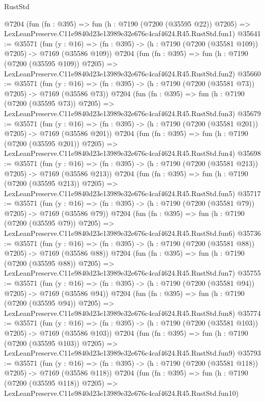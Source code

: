 \begin{lexlean}{RustStd}
\begin{coremodule}
    @7204
    (fun (fn : @395) =>
    fun (h : @7190 (@7200 (@35595 @22)) @7205) =>
    LexLeanPreserve.C11e9840d23e13989e32e676c4caf4624.R45.RustStd.fun1)
@35641 := @35571
    (fun (y : @16) => (fn : @395) -> (h : @7190 (@7200 (@35581 @109)) @7205) -> @7169 (@35586 @109))
    @7204
    (fun (fn : @395) =>
    fun (h : @7190 (@7200 (@35595 @109)) @7205) =>
    LexLeanPreserve.C11e9840d23e13989e32e676c4caf4624.R45.RustStd.fun2)
@35660 := @35571
    (fun (y : @16) => (fn : @395) -> (h : @7190 (@7200 (@35581 @73)) @7205) -> @7169 (@35586 @73))
    @7204
    (fun (fn : @395) =>
    fun (h : @7190 (@7200 (@35595 @73)) @7205) =>
    LexLeanPreserve.C11e9840d23e13989e32e676c4caf4624.R45.RustStd.fun3)
@35679 := @35571
    (fun (y : @16) => (fn : @395) -> (h : @7190 (@7200 (@35581 @201)) @7205) -> @7169 (@35586 @201))
    @7204
    (fun (fn : @395) =>
    fun (h : @7190 (@7200 (@35595 @201)) @7205) =>
    LexLeanPreserve.C11e9840d23e13989e32e676c4caf4624.R45.RustStd.fun4)
@35698 := @35571
    (fun (y : @16) => (fn : @395) -> (h : @7190 (@7200 (@35581 @213)) @7205) -> @7169 (@35586 @213))
    @7204
    (fun (fn : @395) =>
    fun (h : @7190 (@7200 (@35595 @213)) @7205) =>
    LexLeanPreserve.C11e9840d23e13989e32e676c4caf4624.R45.RustStd.fun5)
@35717 := @35571
    (fun (y : @16) => (fn : @395) -> (h : @7190 (@7200 (@35581 @79)) @7205) -> @7169 (@35586 @79))
    @7204
    (fun (fn : @395) =>
    fun (h : @7190 (@7200 (@35595 @79)) @7205) =>
    LexLeanPreserve.C11e9840d23e13989e32e676c4caf4624.R45.RustStd.fun6)
@35736 := @35571
    (fun (y : @16) => (fn : @395) -> (h : @7190 (@7200 (@35581 @88)) @7205) -> @7169 (@35586 @88))
    @7204
    (fun (fn : @395) =>
    fun (h : @7190 (@7200 (@35595 @88)) @7205) =>
    LexLeanPreserve.C11e9840d23e13989e32e676c4caf4624.R45.RustStd.fun7)
@35755 := @35571
    (fun (y : @16) => (fn : @395) -> (h : @7190 (@7200 (@35581 @94)) @7205) -> @7169 (@35586 @94))
    @7204
    (fun (fn : @395) =>
    fun (h : @7190 (@7200 (@35595 @94)) @7205) =>
    LexLeanPreserve.C11e9840d23e13989e32e676c4caf4624.R45.RustStd.fun8)
@35774 := @35571
    (fun (y : @16) => (fn : @395) -> (h : @7190 (@7200 (@35581 @103)) @7205) -> @7169 (@35586 @103))
    @7204
    (fun (fn : @395) =>
    fun (h : @7190 (@7200 (@35595 @103)) @7205) =>
    LexLeanPreserve.C11e9840d23e13989e32e676c4caf4624.R45.RustStd.fun9)
@35793 := @35571
    (fun (y : @16) => (fn : @395) -> (h : @7190 (@7200 (@35581 @118)) @7205) -> @7169 (@35586 @118))
    @7204
    (fun (fn : @395) =>
    fun (h : @7190 (@7200 (@35595 @118)) @7205) =>
    LexLeanPreserve.C11e9840d23e13989e32e676c4caf4624.R45.RustStd.fun10)

\end{coremodule}
\end{lexlean}
